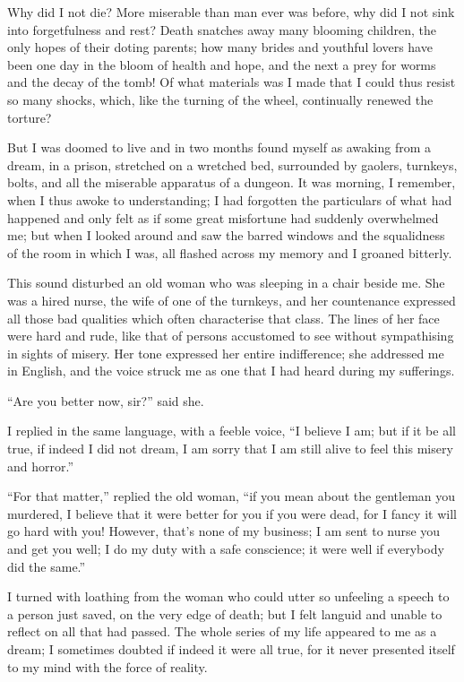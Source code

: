 \documentclass[12pt,openright]{book}
\begin{document}
Why did I not die? More miserable than man ever was before, why did I not sink into forgetfulness and rest? Death snatches away many blooming children, the only hopes of their doting parents; how many brides and youthful lovers have been one day in the bloom of health and hope, and the next a prey for worms and the decay of the tomb! Of what materials was I made that I could thus resist so many shocks, which, like the turning of the wheel, continually renewed the torture?

But I was doomed to live and in two months found myself as awaking from a dream, in a prison, stretched on a wretched bed, surrounded by gaolers, turnkeys, bolts, and all the miserable apparatus of a dungeon. It was morning, I remember, when I thus awoke to understanding; I had forgotten the particulars of what had happened and only felt as if some great misfortune had suddenly overwhelmed me; but when I looked around and saw the barred windows and the squalidness of the room in which I was, all flashed across my memory and I groaned bitterly.

This sound disturbed an old woman who was sleeping in a chair beside me. She was a hired nurse, the wife of one of the turnkeys, and her countenance expressed all those bad qualities which often characterise that class. The lines of her face were hard and rude, like that of persons accustomed to see without sympathising in sights of misery. Her tone expressed her entire indifference; she addressed me in English, and the voice struck me as one that I had heard during my sufferings.

“Are you better now, sir?” said she.

I replied in the same language, with a feeble voice, “I believe I am; but if it be all true, if indeed I did not dream, I am sorry that I am still alive to feel this misery and horror.”

“For that matter,” replied the old woman, “if you mean about the gentleman you murdered, I believe that it were better for you if you were dead, for I fancy it will go hard with you! However, that’s none of my business; I am sent to nurse you and get you well; I do my duty with a safe conscience; it were well if everybody did the same.”

I turned with loathing from the woman who could utter so unfeeling a speech to a person just saved, on the very edge of death; but I felt languid and unable to reflect on all that had passed. The whole series of my life appeared to me as a dream; I sometimes doubted if indeed it were all true, for it never presented itself to my mind with the force of reality.
\end{document}
